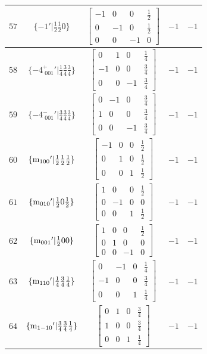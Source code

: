 \documentclass[fleqn,8pt]{jsarticle}
\begin{document}
\begin{longtable}{ccccc}
$ 57 $ & $ \{-1{}'|\frac{1}{2} \frac{1}{2} 0\} $ & $ \begin{bmatrix} -1 & 0 & 0 & \frac{1}{2} \\ 0 & -1 & 0 & \frac{1}{2} \\ 0 & 0 & -1 & 0 \end{bmatrix} $ & $ -1 $ & $ -1 $ \\ \hline
$ 58 $ & $ \{-4^{+}_{\,\,001}{}'|\frac{1}{4} \frac{3}{4} \frac{3}{4}\} $ & $ \begin{bmatrix} 0 & 1 & 0 & \frac{1}{4} \\ -1 & 0 & 0 & \frac{3}{4} \\ 0 & 0 & -1 & \frac{3}{4} \end{bmatrix} $ & $ -1 $ & $ -1 $ \\ \hline
$ 59 $ & $ \{-4^{-}_{\,\,001}{}'|\frac{3}{4} \frac{3}{4} \frac{3}{4}\} $ & $ \begin{bmatrix} 0 & -1 & 0 & \frac{3}{4} \\ 1 & 0 & 0 & \frac{3}{4} \\ 0 & 0 & -1 & \frac{3}{4} \end{bmatrix} $ & $ -1 $ & $ -1 $ \\ \hline
$ 60 $ & $ \{{\rm m}_{100}{}'|\frac{1}{2} \frac{1}{2} \frac{1}{2}\} $ & $ \begin{bmatrix} -1 & 0 & 0 & \frac{1}{2} \\ 0 & 1 & 0 & \frac{1}{2} \\ 0 & 0 & 1 & \frac{1}{2} \end{bmatrix} $ & $ -1 $ & $ -1 $ \\ \hline
$ 61 $ & $ \{{\rm m}_{010}{}'|\frac{1}{2} 0 \frac{1}{2}\} $ & $ \begin{bmatrix} 1 & 0 & 0 & \frac{1}{2} \\ 0 & -1 & 0 & 0 \\ 0 & 0 & 1 & \frac{1}{2} \end{bmatrix} $ & $ -1 $ & $ -1 $ \\ \hline
$ 62 $ & $ \{{\rm m}_{001}{}'|\frac{1}{2} 0 0\} $ & $ \begin{bmatrix} 1 & 0 & 0 & \frac{1}{2} \\ 0 & 1 & 0 & 0 \\ 0 & 0 & -1 & 0 \end{bmatrix} $ & $ -1 $ & $ -1 $ \\ \hline
$ 63 $ & $ \{{\rm m}_{110}{}'|\frac{1}{4} \frac{3}{4} \frac{1}{4}\} $ & $ \begin{bmatrix} 0 & -1 & 0 & \frac{1}{4} \\ -1 & 0 & 0 & \frac{3}{4} \\ 0 & 0 & 1 & \frac{1}{4} \end{bmatrix} $ & $ -1 $ & $ -1 $ \\ \hline
$ 64 $ & $ \{{\rm m}_{1-10}{}'|\frac{3}{4} \frac{3}{4} \frac{1}{4}\} $ & $ \begin{bmatrix} 0 & 1 & 0 & \frac{3}{4} \\ 1 & 0 & 0 & \frac{3}{4} \\ 0 & 0 & 1 & \frac{1}{4} \end{bmatrix} $ & $ -1 $ & $ -1 $ \\
\end{longtable}
\end{document}
